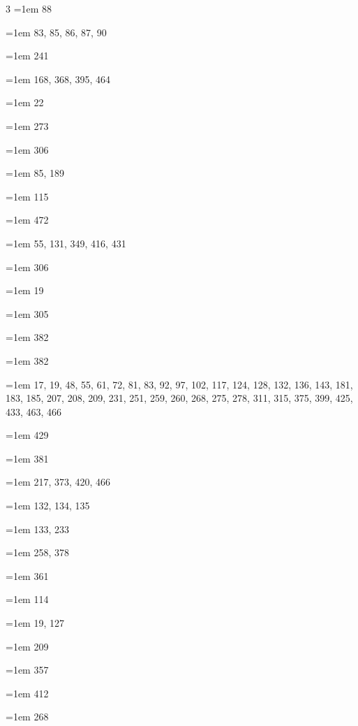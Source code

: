 \begin{multicols}{3}
\hangindent=1em  88\par
\hangindent=1em  83, 85, 86, 87, 90\par
\hangindent=1em  241\par
\hangindent=1em  168, 368, 395, 464\par
\hangindent=1em  22\par
\hangindent=1em  273\par
\hangindent=1em  306\par
\hangindent=1em  85, 189\par
\hangindent=1em  115\par
\hangindent=1em  472\par
\hangindent=1em  55, 131, 349, 416, 431\par
\hangindent=1em  306\par
\hangindent=1em  19\par
\hangindent=1em  305\par
\hangindent=1em  382\par
\hangindent=1em  382\par
\hangindent=1em  17, 19, 48, 55, 61, 72, 81, 83, 92, 97, 102, 117, 124, 128, 132, 136, 143, 181, 183, 185, 207, 208, 209, 231, 251, 259, 260, 268, 275, 278, 311, 315, 375, 399, 425, 433, 463, 466\par
\hangindent=1em  429\par
\hangindent=1em  381\par
\hangindent=1em  217, 373, 420, 466\par
\hangindent=1em  132, 134, 135\par
\hangindent=1em  133, 233\par
\hangindent=1em  258, 378\par
\hangindent=1em  361\par
\hangindent=1em  114\par
\hangindent=1em  19, 127\par
\hangindent=1em  209\par
\hangindent=1em  357\par
\hangindent=1em  412\par
\hangindent=1em  268\par

\end{multicols}
